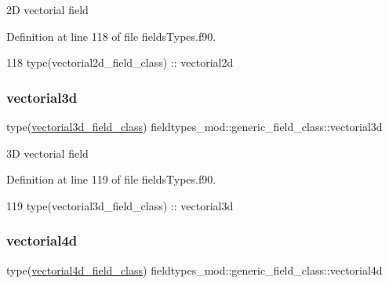 2D vectorial field 



Definition at line 118 of file fields\+Types.\+f90.


\begin{DoxyCode}
118         \textcolor{keywordtype}{type}(vectorial2d\_field\_class) :: vectorial2d
\end{DoxyCode}
\mbox{\label{structfieldtypes__mod_1_1generic__field__class_aff0ebfb0a2e374714172bd0e7202f036}} 
\subsubsection{\texorpdfstring{vectorial3d}{vectorial3d}}
{\footnotesize\ttfamily type(\mbox{\hyperlink{structfieldtypes__mod_1_1vectorial3d__field__class}{vectorial3d\+\_\+field\+\_\+class}}) fieldtypes\+\_\+mod\+::generic\+\_\+field\+\_\+class\+::vectorial3d\hspace{0.3cm}{\ttfamily [private]}}



3D vectorial field 



Definition at line 119 of file fields\+Types.\+f90.


\begin{DoxyCode}
119         \textcolor{keywordtype}{type}(vectorial3d\_field\_class) :: vectorial3d
\end{DoxyCode}
\mbox{\label{structfieldtypes__mod_1_1generic__field__class_a9a4f0f601cf52de94dcbbaa0a48bcf95}} 
\subsubsection{\texorpdfstring{vectorial4d}{vectorial4d}}
{\footnotesize\ttfamily type(\mbox{\hyperlink{structfieldtypes__mod_1_1vectorial4d__field__class}{vectorial4d\+\_\+field\+\_\+class}}) fieldtypes\+\_\+mod\+::generic\+\_\+field\+\_\+class\+::vectorial4d\hspace{0.3cm}{\ttfamily [private]}}



